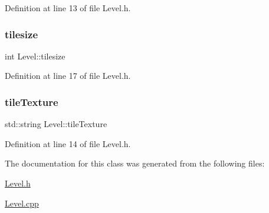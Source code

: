 Definition at line 13 of file Level.\+h.

\hypertarget{class_level_a8fc823f22882c2201f1488ef7ee3ec20}{}\label{class_level_a8fc823f22882c2201f1488ef7ee3ec20} 
\subsubsection{\texorpdfstring{tilesize}{tilesize}}
{\footnotesize\ttfamily int Level\+::tilesize}



Definition at line 17 of file Level.\+h.

\hypertarget{class_level_a294430cb49d808ff4c63e5f4dbbdcbde}{}\label{class_level_a294430cb49d808ff4c63e5f4dbbdcbde} 
\subsubsection{\texorpdfstring{tile\+Texture}{tileTexture}}
{\footnotesize\ttfamily std\+::string Level\+::tile\+Texture}



Definition at line 14 of file Level.\+h.



The documentation for this class was generated from the following files\+:\begin{DoxyCompactItemize}
\item 
\hyperlink{_level_8h}{Level.\+h}\item 
\hyperlink{_level_8cpp}{Level.\+cpp}\end{DoxyCompactItemize}
